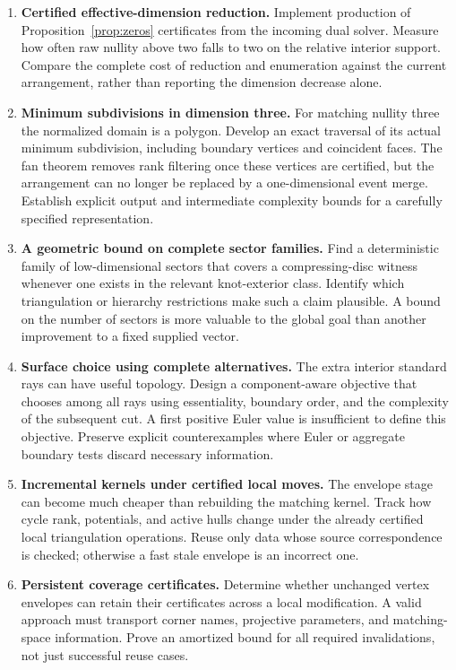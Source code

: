 \documentclass[11pt]{article}
\theoremstyle{definition}
\theoremstyle{remark}
\begin{document}
\begin{enumerate}[label=\textbf{\arabic*.},leftmargin=*]
\item \textbf{Certified effective-dimension reduction.}
Implement production of Proposition~\ref{prop:zeros} certificates from the
incoming dual solver. Measure how often raw nullity above two falls to two
on the relative interior support. Compare the complete cost of reduction and
enumeration against the current arrangement, rather than reporting the
dimension decrease alone.

\item \textbf{Minimum subdivisions in dimension three.}
For matching nullity three the normalized domain is a polygon. Develop an
exact traversal of its actual minimum subdivision, including boundary
vertices and coincident faces. The fan theorem removes rank filtering once
these vertices are certified, but the arrangement can no longer be replaced
by a one-dimensional event merge. Establish explicit output and intermediate
complexity bounds for a carefully specified representation.

\item \textbf{A geometric bound on complete sector families.}
Find a deterministic family of low-dimensional sectors that covers a
compressing-disc witness whenever one exists in the relevant knot-exterior
class. Identify which triangulation or hierarchy restrictions make such a
claim plausible. A bound on the number of sectors is more valuable to the
global goal than another improvement to a fixed supplied vector.

\item \textbf{Surface choice using complete alternatives.}
The extra interior standard rays can have useful topology. Design a
component-aware objective that chooses among all rays using essentiality,
boundary order, and the complexity of the subsequent cut. A first positive
Euler value is insufficient to define this objective. Preserve explicit
counterexamples where Euler or aggregate boundary tests discard necessary
information.

\item \textbf{Incremental kernels under certified local moves.}
The envelope stage can become much cheaper than rebuilding the matching
kernel. Track how cycle rank, potentials, and active hulls change under the
already certified local triangulation operations. Reuse only data whose
source correspondence is checked; otherwise a fast stale envelope is an
incorrect one.

\item \textbf{Persistent coverage certificates.}
Determine whether unchanged vertex envelopes can retain their certificates
across a local modification. A valid approach must transport corner names,
projective parameters, and matching-space information. Prove an amortized
bound for all required invalidations, not just successful reuse cases.


\end{enumerate}
\end{document}
